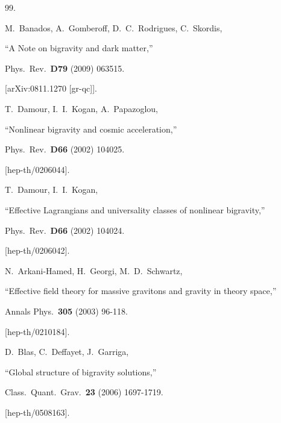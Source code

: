 \documentclass [prd,reprint,eqsecnum,nofootinbib]  {revtex4-1}
\begin{document}
\begin{thebibliography}{99.}


  M.~Banados, A.~Gomberoff, D.~C.~Rodrigues, C.~Skordis,

  ``A Note on bigravity and dark matter,''

  Phys.\ Rev.\  {\bf D79 } (2009)  063515.

  [arXiv:0811.1270 [gr-qc]].





  T.~Damour, I.~I.~Kogan, A.~Papazoglou,

  ``Nonlinear bigravity and cosmic acceleration,''

  Phys.\ Rev.\  {\bf D66 } (2002)  104025.

  [hep-th/0206044].





  T.~Damour, I.~I.~Kogan,

 ``Effective Lagrangians and universality classes of nonlinear bigravity,''

  Phys.\ Rev.\  {\bf D66 } (2002)  104024.

  [hep-th/0206042].







  N.~Arkani-Hamed, H.~Georgi, M.~D.~Schwartz,

  ``Effective field theory for massive gravitons and gravity in theory space,''

  Annals Phys.\  {\bf 305 } (2003)  96-118.

  [hep-th/0210184].





  D.~Blas, C.~Deffayet, J.~Garriga,

 ``Global structure of bigravity solutions,''

  Class.\ Quant.\ Grav.\  {\bf 23 } (2006)  1697-1719.

  [hep-th/0508163].





\end{thebibliography}
\end{document}
